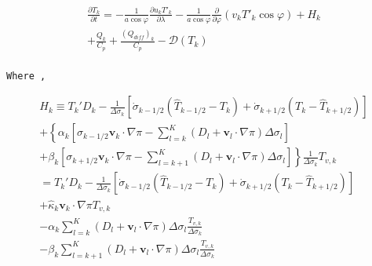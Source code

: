 \begin{eqnarray}
  \frac{\partial T_k}{\partial t}
     =  - \frac{1}{a\cos\varphi}
               \frac{\partial u_k T'_k}{\partial \lambda}
          - \frac{1}{a\cos\varphi}
               \frac{\partial }{\partial \varphi} (v_k T'_k \cos\varphi)
          + H_k  \\
        + \frac{Q_k}{C_{p}}
          + \frac{(Q_{diff})_k}{C_p} 
          - {\mathcal D}(T_k)  \\
\end{eqnarray}

\begin{verbatim}
Where ,
\end{verbatim}

\begin{eqnarray}
   H_k 
     \equiv  T_k' D_k
              - \frac{1}{\Delta \sigma_k} 
             [   \dot{\sigma}_{k-1/2} ( \hat{T}_{k-1/2} - T_k   )
               + \dot{\sigma}_{k+1/2} ( T_k   - \hat{T}_{k+1/2} ) ]
                \\
        + \left\{ \alpha_k
                    \left[ \sigma_{k-1/2} \mathbf{v}_k \cdot \nabla \pi
                          - \sum_{l=k}^{K} 
                           ( D_l + \mathbf{v}_l \cdot \nabla \pi )
                            \Delta  \sigma_l
                    \right]
             \right.    \\
          + \left. \beta_k
                     \left[ \sigma_{k+1/2} \mathbf{v}_k \cdot \nabla \pi
                          - \sum_{l=k+1}^{K} 
                           ( D_l + \mathbf{v}_l \cdot \nabla \pi )
                            \Delta  \sigma_l
                    \right]
              \right\} 
              \frac{1}{\Delta \sigma_k} T_{v,k}   \\
%
     =  T_k' D_k 
          - \frac{1}{\Delta \sigma_k} 
             [   \dot{\sigma}_{k-1/2} ( \hat{T}_{k-1/2} - T_k   )
               + \dot{\sigma}_{k+1/2} ( T_k   - \hat{T}_{k+1/2} ) ]
                \\
        + \hat{\kappa}_k \mathbf{v}_k \cdot \nabla \pi T_{v,k} 
                \\
        - \alpha_k \sum_{l=k}^{K} 
                           ( D_l + \mathbf{v}_l \cdot \nabla \pi )
                            \Delta  \sigma_l 
                            \frac{T_{v,k}}{\Delta \sigma_k} 
                \\
        - \beta_k \sum_{l=k+1}^{K} 
                           ( D_l + \mathbf{v}_l \cdot \nabla \pi )
                            \Delta  \sigma_l 
                            \frac{T_{v,k}}{\Delta \sigma_k} 
\end{eqnarray}

